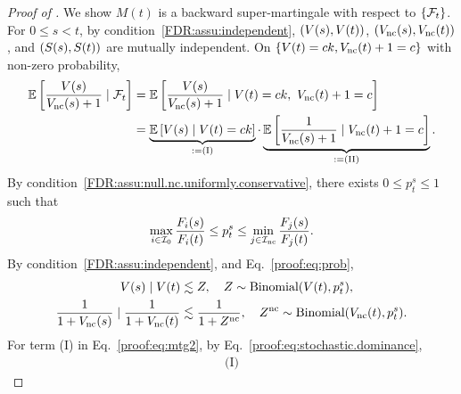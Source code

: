 \begin{proof}[Proof of ]
We show $M(t)$ is a backward super-martingale with respect to $\{\mathcal{F}_t\}$.
For $0 \le s < t$, by condition~\ref{FDR:assu:independent}, $({V}(s), {V}(t))$, $({V}_{\text{nc}}(s), {V}_{\text{nc}}(t))$, and $({S}(s), {S}(t))$ are mutually independent.
On $\left\{{V}(t) = ck, {V_{\text{nc}}}(t) + 1 = c\right\}$ with non-zero probability,
\begin{align}\label{proof:eq:mtg2}
\begin{split}
    \mathbb{E}\left[ \frac{{V}(s)}{{V_{\text{nc}}}(s) + 1} \mid \mathcal{F}_t \right]
    &= \mathbb{E}\left[ \frac{{V}(s)}{{V_{\text{nc}}}(s) + 1} \mid {V}(t) = ck, ~{V_{\text{nc}}}(t) + 1 = c \right]\\
    &=  \underbrace{\mathbb{E}\left[V(s) \mid V(t) = ck\right]}_{:=\text{(I)}} \cdot \underbrace{\mathbb{E}\left[\frac{1}{{V_{\text{nc}}}(s) + 1} \mid {V_{\text{nc}}}(t) + 1 = c \right]}_{:=\text{(II)}}.
\end{split}
\end{align}
By condition~\ref{FDR:assu:null.nc.uniformly.conservative}, there exists $0 \le p_{t}^s \le 1$ such that
\begin{align}\label{proof:eq:prob}
    \max_{i \in {\mathcal{I}_{0}} }\frac{{F_{i}}(s)}{{F_{i}}(t)}
    \le  p_{t}^s
    \le \min_{j \in {\mathcal{I}_{\text{nc}}} }\frac{{F_{j}}(s)}{{F_{j}}(t)}.
\end{align}
By condition~\ref{FDR:assu:independent}, and Eq.~\eqref{proof:eq:prob},
\begin{align}\label{proof:eq:stochastic.dominance}
    {V}(s) \mid {V}(t) &\lesssim Z, \quad Z \sim \text{Binomial}({V}(t), p_t^s),\\ \label{proof:eq:stochastic.dominance.2}
    \frac{1}{1+{V_{\text{nc}}}(s)} \mid \frac{1}{1+{V_{\text{nc}}}(t)} &\lesssim \frac{1}{1+Z^{\text{nc}}}, \quad Z^{\text{nc}} \sim \text{Binomial}({V_{\text{nc}}}(t), p_t^s).
\end{align}
For term (I) in Eq.~\eqref{proof:eq:mtg2}, by Eq.~\eqref{proof:eq:stochastic.dominance},
\begin{align}\label{proof:eq:mtg(I)}
    \text{(I)}

\end{align}
\end{proof}

